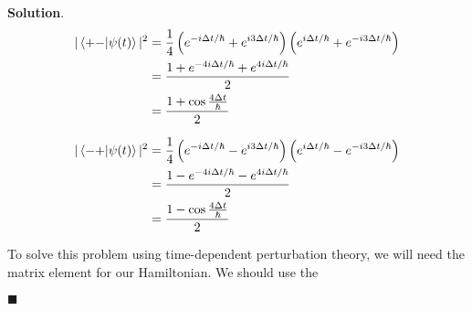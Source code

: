 \documentclass[12pt]{article}
\theoremstyle{definition}
\newenvironment{s}{%
        \begin{trivlist} \item \textbf{Solution}. }{%
            \hspace*{\fill} $\blacksquare$\end{trivlist}}%
\begin{document}
{\begin{s}
\begin{align*}
|\bra{+-}\ket{\psi(t)}|^{2} &= \frac{1}{4}\left(e^{-i\Delta t/\hbar} + e^{i3\Delta t/\hbar}\right)\left(e^{i\Delta t/\hbar} + e^{-i3\Delta t/\hbar}\right)\\
&= \frac{1+ e^{-4i\Delta t / \hbar} + e^{4i\Delta t / \hbar}}{2}\\
&= \frac{1+\cos\frac{4\Delta t}{\hbar}}{2}
\end{align*}

\begin{align*}
|\bra{-+}\ket{\psi(t)}|^{2} &= \frac{1}{4}\left(e^{-i\Delta t/\hbar} - e^{i3\Delta t/\hbar}\right)\left(e^{i\Delta t/\hbar} - e^{-i3\Delta t/\hbar}\right)\\
&= \frac{1 - e^{-4i\Delta t / \hbar} - e^{4i\Delta t / \hbar}}{2}\\
&= \frac{1-\cos\frac{4\Delta t}{\hbar}}{2}
\end{align*}


To solve this problem using time-dependent perturbation theory, we will need the matrix element for our Hamiltonian. We should use the 



\end{s}
\end{document}
